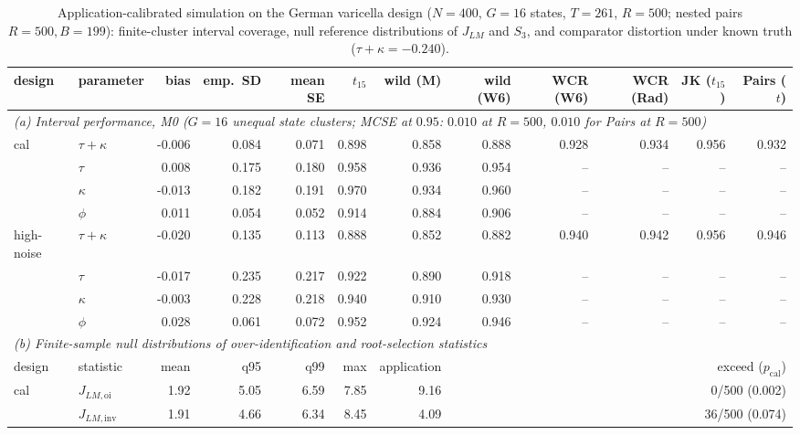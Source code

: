 \begin{table}[!t]
\centering
\caption{Application-calibrated simulation on the German varicella design ($N=400$, $G=16$ states, $T=261$, $R=500$; nested pairs $R=500, B=199$): finite-cluster interval coverage, null reference distributions of $J_{LM}$ and $S_3$, and comparator distortion under known truth ($\tau+\kappa=-0.240$).}
\label{tab:rev-calsim}
\scriptsize
\setlength{\tabcolsep}{2.4pt}
\begin{adjustbox}{max width=\linewidth,max totalheight=0.68\textheight}
\renewcommand{\arraystretch}{0.74}\begin{tabular}{llrrrrrrrrrr}
\toprule
design & parameter & bias & emp.\ SD & mean SE & $t_{15}$ & wild (M) & wild (W6) & WCR (W6) & WCR (Rad) & JK ($t_{15}$) & Pairs ($t$) \\
\midrule
\multicolumn{12}{l}{\emph{(a) Interval performance, M0 ($G = 16$ unequal state clusters; MCSE at $0.95$: $0.010$ at $R=500$, $0.010$ for Pairs at $R=500$)}} \\
cal & $\tau+\kappa$ & -0.006 & 0.084 & 0.071 & 0.898 & 0.858 & 0.888 & 0.928 & 0.934 & 0.956 & 0.932 \\
 & $\tau$ & 0.008 & 0.175 & 0.180 & 0.958 & 0.936 & 0.954 & -- & -- & -- & -- \\
 & $\kappa$ & -0.013 & 0.182 & 0.191 & 0.970 & 0.934 & 0.960 & -- & -- & -- & -- \\
 & $\phi$ & 0.011 & 0.054 & 0.052 & 0.914 & 0.884 & 0.906 & -- & -- & -- & -- \\
high-noise & $\tau+\kappa$ & -0.020 & 0.135 & 0.113 & 0.888 & 0.852 & 0.882 & 0.940 & 0.942 & 0.956 & 0.946 \\
 & $\tau$ & -0.017 & 0.235 & 0.217 & 0.922 & 0.890 & 0.918 & -- & -- & -- & -- \\
 & $\kappa$ & -0.003 & 0.228 & 0.218 & 0.940 & 0.910 & 0.930 & -- & -- & -- & -- \\
 & $\phi$ & 0.028 & 0.061 & 0.072 & 0.952 & 0.924 & 0.946 & -- & -- & -- & -- \\
\midrule
\multicolumn{12}{l}{\emph{(b) Finite-sample null distributions of over-identification and root-selection statistics}} \\
design & statistic & mean & q95 & q99 & max & application & \multicolumn{5}{r}{exceed ($p_{\mathrm{cal}}$)} \\
\midrule
cal & $J_{LM,\mathrm{oi}}$ & 1.92 & 5.05 & 6.59 & 7.85 & 9.16 & \multicolumn{5}{r}{0/500 (0.002)} \\
 & $J_{LM,\mathrm{inv}}$ & 1.91 & 4.66 & 6.34 & 8.45 & 4.09 & \multicolumn{5}{r}{36/500 (0.074)} \\

\end{tabular}
\end{adjustbox}
\end{table}
